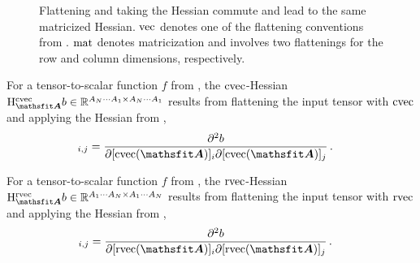\begin{figure}[!h]
  \centering
  \caption{Flattening and taking the Hessian commute and lead to the same matricized Hessian.
    $\vec$ denotes one of the flattening conventions from .
    $\mat$ denotes matricization and involves two flattenings for the row and column dimensions, respectively.}
\end{figure}


\begin{definition}\label{def:cvec_hessian}
  For a tensor-to-scalar function $f$ from , the $\cvec$-Hessian $\hess_{\tA}^{\cvec}b \in \sR^{A_N \cdots A_1 \times A_N \cdots A_1}$ results from flattening the input tensor with $\cvec$ and applying the Hessian from ,
  \begin{align*}
    [\hess^{\cvec}_{\tA}b]_{i, j}
    &=
      \frac{\partial^2 b}{\partial [\cvec(\tA)]_{i} \partial [\cvec(\tA)]_{j}}\,.
  \end{align*}
\end{definition}

\begin{definition}\label{def:rvec_hessian}
  For a tensor-to-scalar function $f$ from , the $\rvec$-Hessian $\hess_{\tA}^{\rvec}b \in \sR^{A_1 \cdots A_N \times A_1 \cdots A_N}$ results from flattening the input tensor with $\rvec$ and applying the Hessian from ,
  \begin{align*}
    [\hess^{\rvec}_{\tA}b]_{i, j}
    &=
      \frac{\partial^2 b}{\partial [\rvec(\tA)]_{i} \partial [\rvec(\tA)]_{j}}\,.
  \end{align*}
\end{definition}


